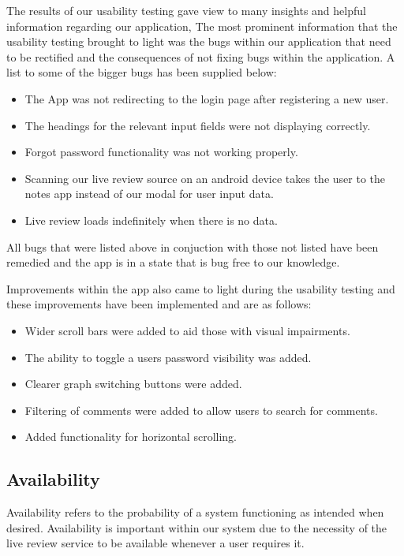 \documentclass[12pt]{article}
\begin{document}
The results of our usability testing gave view to many insights and helpful information regarding our application, The most prominent information that the usability testing brought to light was the bugs within our application that need to be rectified and the consequences of not fixing bugs within the application. 
A list to some of the bigger bugs has been supplied below:
\begin{itemize}
    \item The App was not redirecting to the login page after registering a new user.
    \item The headings for the relevant input fields were not displaying correctly.
    \item Forgot password functionality was not working properly.
    \item Scanning our live review source on an android device takes the user to the notes app instead of our modal for user input data.
    \item Live review loads indefinitely when there is no data.
\end{itemize}
All bugs that were listed above in conjuction with those not listed have been remedied and the app is in a state that is bug free to our knowledge.
\par
Improvements within the app also came to light during the usability testing and these improvements have been implemented and are as follows:
\begin{itemize}
    \item Wider scroll bars were added to aid those with visual impairments.
    \item The ability to toggle a users password visibility was added.
    \item Clearer graph switching buttons were added.
    \item Filtering of comments were added to allow users to search for comments.
    \item Added functionality for horizontal scrolling.
\end{itemize}



\newpage
\subsection{Availability}
Availability refers to the probability of a system functioning as intended when desired. Availability is important within our system due to the
necessity of the live review service to be available whenever a user requires it.
\end{document}
